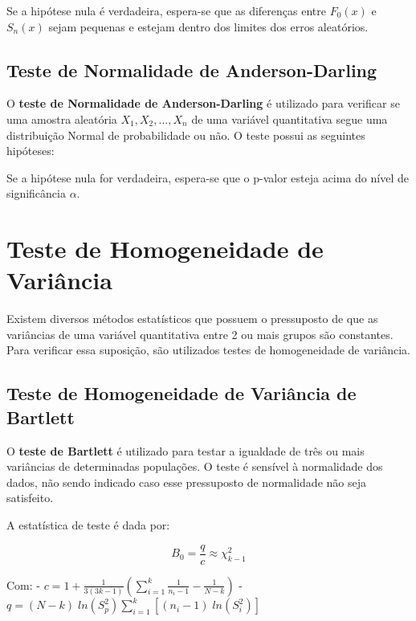\documentclass[
  portuguese,
]{estat/estat}
\let\oldsection\section
\renewcommand\section{\clearpage\oldsection}
\begin{document}
Se a hipótese nula é verdadeira, espera-se que as diferenças entre
\(F_0(x)\) e \(S_n(x)\) sejam pequenas e estejam dentro dos limites dos
erros aleatórios.

\subsection{Teste de Normalidade de
Anderson-Darling}\label{teste-de-normalidade-de-anderson-darling}

O \textbf{teste de Normalidade de Anderson-Darling} é utilizado para
verificar se uma amostra aleatória \(X_1, X_2, ..., X_n\) de uma
variável quantitativa segue uma distribuição Normal de probabilidade ou
não. O teste possui as seguintes hipóteses:

\begin{center}
\end{center}

Se a hipótese nula for verdadeira, espera-se que o p-valor esteja acima
do nível de significância \(\alpha\).

\section{Teste de Homogeneidade de
Variância}\label{teste-de-homogeneidade-de-variuxe2ncia}

Existem diversos métodos estatísticos que possuem o pressuposto de que
as variâncias de uma variável quantitativa entre 2 ou mais grupos são
constantes. Para verificar essa suposição, são utilizados testes de
homogeneidade de variância.

\subsection{Teste de Homogeneidade de Variância de
Bartlett}\label{teste-de-homogeneidade-de-variuxe2ncia-de-bartlett}

O \textbf{teste de Bartlett} é utilizado para testar a igualdade de três
ou mais variâncias de determinadas populações. O teste é sensível à
normalidade dos dados, não sendo indicado caso esse pressuposto de
normalidade não seja satisfeito.

A estatística de teste é dada por:

\[ B_0 = \frac{q}{c} \approx \chi^2_{k-1} \]

Com: -
\(\displaystyle c = 1 + \frac{1}{3(3k-1)}\left(\sum_{i=1}^{k} \frac{1}{n_i - 1} - \frac{1}{N - k}\right)\)
-
\(\displaystyle q = (N - k) \; ln \left( S^2_p \right) \sum_{i=1}^{k} \left[(n_i - 1) \; ln \left( S^2_i \right) \right]\)
\end{document}
